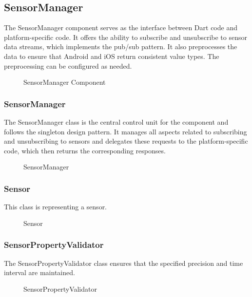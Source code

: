 \documentclass[12pt]{article}
\begin{document}
\subsection{SensorManager}
The SensorManager component serves as the interface between Dart code and platform-specific code. It offers the ability to subscribe and unsubscribe to sensor data streams, which implements the pub/sub pattern. It also preprocesses the data to ensure that Android and iOS return consistent value types. The preprocessing can be configured as needed.
\begin{figure}[ht]
\centering

\caption{\label{fig:bild9} SensorManager Component}
\end{figure}

\subsubsection{SensorManager}
The SensorManager class is the central control unit for the component and follows the singleton design pattern. It manages all aspects related to subscribing and unsubscribing to sensors and delegates these requests to the platform-specific code, which then returns the corresponding responses.
\begin{figure}[ht]
\centering

\caption{\label{fig:bild10} SensorManager}
\end{figure}

\subsubsection{Sensor}
This class is representing a sensor.
\begin{figure}[ht]
\centering

\caption{\label{fig:bild11} Sensor}
\end{figure}

\subsubsection{SensorPropertyValidator}
The SensorPropertyValidator class ensures that the specified precision and time interval are maintained.
\begin{figure}[ht]
\centering

\caption{\label{fig:bild12} SensorPropertyValidator}
\end{figure}
\newpage
\end{document}
